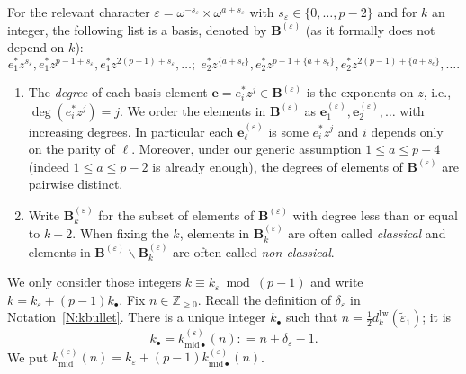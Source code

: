 \begin{notation}
    \label{E:basis_of_Sdagger}
    For the relevant character $\varepsilon = \omega^{-s_\varepsilon} \times \omega^{a+s_\varepsilon}$ with $s_\varepsilon \in \{0, \dots, p-2\}$ and for $k$ an integer, the following list is a basis, denoted by ${\mathbf{B}}^{ (\varepsilon)}$ (as it formally does not depend on $k$):
    \begin{equation}
    e_1^* z^{s_\varepsilon}, e_1^* z^{p-1+s_\varepsilon},e_1^* z^{2(p-1)+s_\varepsilon}, \dots;\; e_2^* z^{\{a+s_\epsilon\}}, e_2^* z^{p-1+\{a+s_\epsilon\}},e_2^* z^{2(p-1)+\{a+s_\epsilon\}}, \dots.
    \end{equation}
    \label{N:power_basis}
    \begin{enumerate}
    \item
    The \emph{degree} of each basis element ${\mathbf{e}}= e_i^*z^j \in {\mathbf{B}}^{ (\varepsilon)}$ is the exponents on $z$, i.e., $\deg (e_i^*z^j) = j$.
    We order the elements in ${\mathbf{B}}^{(\varepsilon)}$ as ${\mathbf{e}}_1^{(\varepsilon)}, {\mathbf{e}}_2^{(\varepsilon)}, \dots$ with increasing degrees. In particular each ${\mathbf{e}}_\ell^{(\varepsilon)}$ is some $e_i^*z^j$ and $i$ depends only on the parity of $\ell$.
    Moreover, under our generic assumption $1\leq a \leq p-4$ (indeed $1\leq a \leq p-2$ is already enough), the degrees of elements of ${\mathbf{B}}^{ (\varepsilon)}$ are pairwise distinct.
    \item
    Write $ {\mathbf{B}}_{k}^{(\varepsilon)} $ for the subset of elements of ${\mathbf{B}}^{(\varepsilon)}$ with degree less than or equal to $k-2$. When fixing the $k$, elements in ${\mathbf{B}}_k^{(\varepsilon)}$ are often called \emph{classical} and elements in ${\mathbf{B}}^{(\varepsilon)} \backslash {\mathbf{B}}_k^{(\varepsilon)}$ are often called \emph{non-classical}.
    \end{enumerate}
\end{notation}

\begin{lemmanotation}
    \label{L:extremal_ks_part1}
    We only consider those integers $k \equiv k_\varepsilon \bmod{(p-1)}$ and write $k=k_\varepsilon+(p-1)k_{\bullet}$. Fix $n\in {\mathbb{Z}}_{ \geq 0}$.
    Recall the definition of $\delta_\varepsilon$ in Notation~\ref{N:kbullet}.
    There is a unique integer $k_\bullet$ such that  $n=\frac 12 d_{k}^{\mathrm{Iw}}(\tilde \varepsilon_1)$; it is
    $$k_\bullet = k_{{\mathrm{mid}}\bullet}^{(\varepsilon)}(n): = n+\delta_\varepsilon-1.$$
    We put $k_{\mathrm{mid}}^{(\varepsilon)}(n) = k_\varepsilon + (p-1)k_{{\mathrm{mid}}\bullet}^{(\varepsilon)}(n)$.
\end{lemmanotation}

